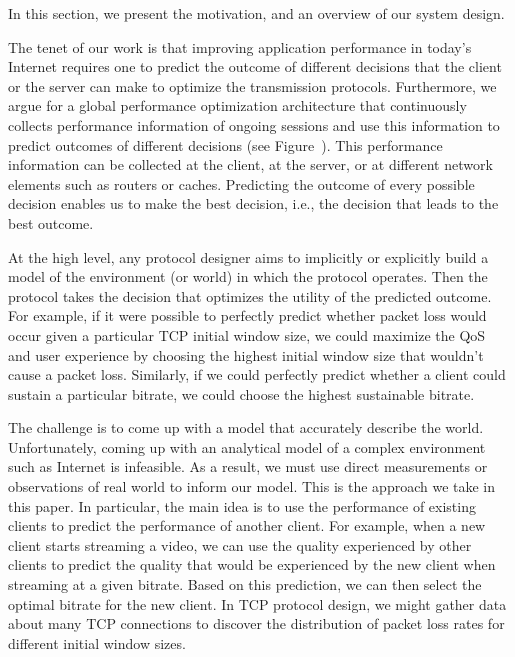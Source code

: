 
In this section, we present the motivation, and an overview of our
system design.

The tenet of our work is that improving application performance in
today's Internet requires one to predict the outcome of different
decisions that the client or the server can make to optimize the
transmission protocols. Furthermore, we argue for a global
performance optimization architecture that continuously collects
performance information of ongoing sessions and use this information to
predict outcomes of different decisions (see Figure~\fillme). This
performance information can be collected at the client, at the server,
or at different network elements such as routers or caches. Predicting
the outcome of every possible decision enables us to make the best
decision, i.e., the decision that leads to the best outcome. 


At the high level, any protocol designer aims to implicitly or
explicitly build a model of the environment (or world) in which the
protocol operates. Then the protocol takes the decision that optimizes
the utility of the predicted outcome.  For example, if it were
possible to perfectly predict whether packet loss would occur given a
particular TCP initial window size, we could maximize the QoS and user
experience by choosing the highest initial window size that wouldn't
cause a packet loss.  Similarly, if we could perfectly predict whether
a client could sustain a particular bitrate, we could choose the
highest sustainable bitrate.

The challenge is to come up with a model that accurately describe the
world. Unfortunately, coming up with an analytical model of a complex 
environment such as Internet is infeasible. As a result, we must
use direct measurements or observations of real world to inform our
model. This is the approach we take in this paper. In particular, the main idea is to
use the performance of existing clients to predict the performance of
another client. For example, when a new client starts streaming a
video, we can use the quality experienced by other clients to predict
the quality that would be experienced by the new client when streaming
at a given bitrate. Based on this prediction, we can then select the
optimal bitrate for the new client.  In TCP protocol design, we might
gather data about many TCP connections to discover the distribution of
packet loss rates for different initial window sizes.  

